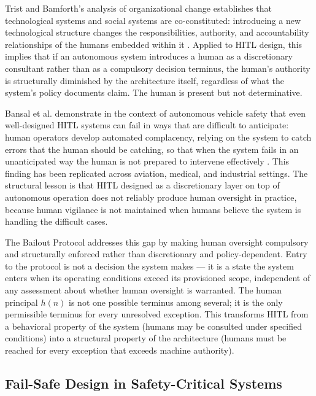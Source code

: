 Trist and Bamforth's analysis of organizational change establishes that technological systems and social systems are co-constituted: introducing a new technological structure changes the responsibilities, authority, and accountability relationships of the humans embedded within it \cite{tristr81}. Applied to HITL design, this implies that if an autonomous system introduces a human as a discretionary consultant rather than as a compulsory decision terminus, the human's authority is structurally diminished by the architecture itself, regardless of what the system's policy documents claim. The human is present but not determinative.

Bansal et al. demonstrate in the context of autonomous vehicle safety that even well-designed HITL systems can fail in ways that are difficult to anticipate: human operators develop automated complacency, relying on the system to catch errors that the human should be catching, so that when the system fails in an unanticipated way the human is not prepared to intervene effectively \cite{bansal2019}. This finding has been replicated across aviation, medical, and industrial settings. The structural lesson is that HITL designed as a discretionary layer on top of autonomous operation does not reliably produce human oversight in practice, because human vigilance is not maintained when humans believe the system is handling the difficult cases.

The Bailout Protocol addresses this gap by making human oversight compulsory and structurally enforced rather than discretionary and policy-dependent. Entry to the protocol is not a decision the system makes --- it is a state the system enters when its operating conditions exceed its provisioned scope, independent of any assessment about whether human oversight is warranted. The human principal $h(n)$ is not one possible terminus among several; it is the only permissible terminus for every unresolved exception. This transforms HITL from a behavioral property of the system (humans may be consulted under specified conditions) into a structural property of the architecture (humans must be reached for every exception that exceeds machine authority).

\subsection{Fail-Safe Design in Safety-Critical Systems}\label{sec:failsafe}

